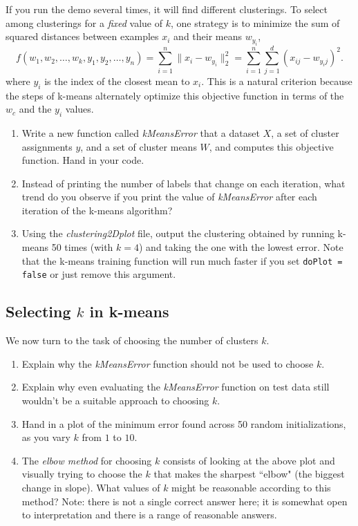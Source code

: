 \documentclass{article}
\def\blu#1{{\color{blu}#1}}
\def\norm#1{\|#1\|}
\def\enum#1{\begin{enumerate}#1\end{enumerate}}
\begin{document}
If you run the demo several times, it will find different clusterings. To select among clusterings for a \emph{fixed} value of $k$, one strategy is to minimize the sum of squared distances between examples $x_i$ and their means $w_{y_i}$,
\[
f(w_1,w_2,\dots,w_k,y_1,y_2,\dots,y_n) = \sum_{i=1}^n \norm{x_i - w_{y_i}}_2^2 = \sum_{i=1}^n \sum_{j=1}^d (x_{ij} - w_{y_ij})^2.
\]
 where $y_i$ is the index of the closest mean to $x_i$. This is a natural criterion because the steps of k-means alternately optimize this objective function in terms of the $w_c$ and the $y_i$ values.
 
 \blu{\enum{
 \item Write a new function called \emph{kMeansError} that a dataset $X$, a set of cluster assignments $y$, and a set of cluster means $W$, and computes this objective function. Hand in your code.
 \item Instead of printing the number of labels that change on each iteration, what trend do you observe if you print the value of \emph{kMeansError} after each iteration of the k-means algorithm?
 \item Using the \emph{clustering2Dplot} file, output the clustering obtained by running k-means 50 times (with $k=4$) and taking the one with the lowest error. Note that the k-means training function will run much faster if you set \texttt{doPlot = false} or just remove this argument.
 }}
 
 \subsection{Selecting $k$ in k-means}
 
 We now turn to the task of choosing the number of clusters $k$.
  
 \blu{\enum{
 \item Explain why the \emph{kMeansError} function should not be used to choose $k$.
 \item Explain why even evaluating the \emph{kMeansError} function on test data still wouldn't be a suitable approach to choosing $k$.
 \item Hand in a plot of the minimum error found across 50 random initializations, as you vary $k$ from $1$ to $10$.
 \item The \emph{elbow method} for choosing $k$ consists of looking at the above plot and visually trying to choose the $k$ that makes the sharpest ``elbow" (the biggest change in slope). What values of $k$ might be reasonable according to this method? Note: there is not a single correct answer here; it is somewhat open to interpretation and there is a range of reasonable answers.
 }}
 
\end{document}
